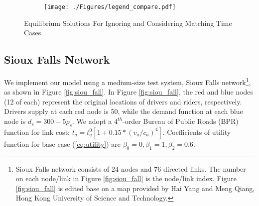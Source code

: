 \documentclass[review]{elsarticle}
\begin{document}
\begin{figure*}[htbp]
	\centering
	\begin{subfigure}[t]{.533\linewidth}
			\centering
			\vspace{-0.5cm}
			\texttt{[image: ./Figures/legend\_compare.pdf]} 
			\label{fig:legend_compare}
	\end{subfigure}
	\vspace{-2em}
	\caption{Equilibrium Solutions For Ignoring and Considering Matching Time Cases}
	\label{fig:ignore_consider_three_node}
\end{figure*}

\subsection{Sioux Falls Network}

We implement our model using a medium-size test system, Sioux Falls network\footnote{Sioux Falls network consists of 24 nodes and 76 directed links. The number on each node/link in Figure \ref{fig:siou_fall} is the node/link index. Figure \ref{fig:siou_fall}  is edited base on a map provided by Hai Yang and Meng Qiang, Hong Kong University of Science and Technology.}, as shown in Figure \ref{fig:siou_fall}. In Figure \ref{fig:siou_fall}, the red and blue nodes (12 of each) represent the  original locations of drivers and riders, respectively. Drivers supply at each red node is 50, while the demand function at each blue node is $d_s = 300 - 5\rho_s$. We adopt a $4^{th}$-order Bureau of Public Roads (BPR) function for link cost: $t_a = t_a^0[1+0.15*(v_a/c_a)^4]$. Coefficients of utility function for base case (\ref{eq:utility}) are $\beta_0 = 0, \beta_1 = 1, \beta_2 =0.6$.
\end{document}
